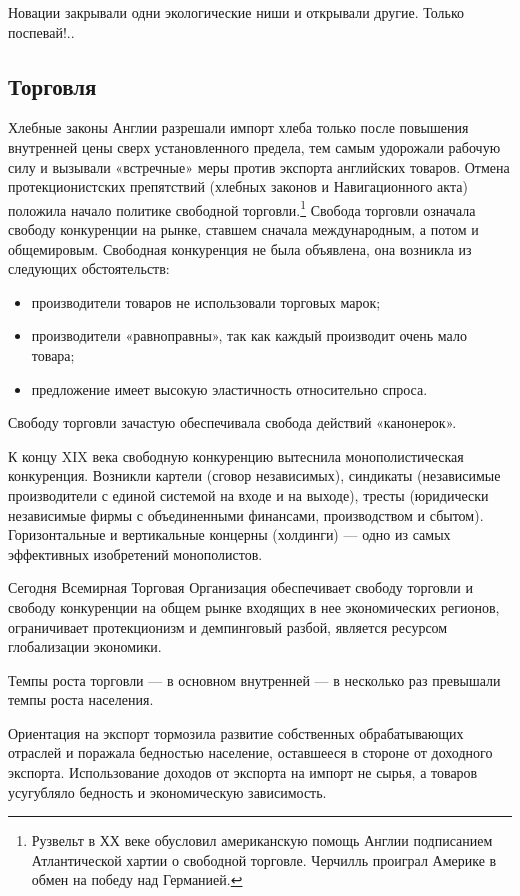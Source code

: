 Новации закрывали одни экологические ниши и открывали другие. Только поспевай!..

\subsection[Торговля]{Торговля}

Хлебные законы Англии разрешали импорт хлеба только после повышения внутренней цены сверх установленного предела, тем
самым удорожали рабочую силу и вызывали «встречные» меры против экспорта английских товаров. Отмена протекционистских
препятствий (хлебных законов и Навигационного акта) положила начало политике свободной
торговли.\footnote{Рузвельт в ХХ веке обусловил американскую помощь Англии подписанием Атлантической
хартии о свободной торговле. Черчилль проиграл Америке в обмен на победу над Германией.} Свобода торговли означала
свободу конкуренции на рынке, ставшем сначала международным, а потом и общемировым. Свободная конкуренция не была
объявлена, она возникла из следующих обстоятельств:

\begin{itemize}
\item производители товаров не использовали торговых марок;
\item производители «равноправны», так как каждый производит очень мало товара;
\item предложение имеет высокую эластичность относительно спроса.
\end{itemize}

Свободу торговли зачастую обеспечивала свобода действий «канонерок».

К концу XIX века свободную конкуренцию вытеснила монополистическая конкуренция. Возникли картели (сговор независимых),
синдикаты (независимые производители с единой системой на входе и на выходе), тресты (юридически независимые фирмы с
объединенными финансами, производством и сбытом). Горизонтальные и вертикальные концерны (холдинги) — одно из самых
эффективных изобретений монополистов.

Сегодня Всемирная Торговая Организация обеспечивает свободу торговли и свободу конкуренции на общем рынке входящих в нее
экономических регионов, ограничивает протекционизм и демпинговый разбой, является ресурсом глобализации экономики.


Темпы роста торговли — в основном внутренней — в несколько раз превышали темпы роста населения.


Ориентация на экспорт тормозила развитие собственных обрабатывающих отраслей и поражала бедностью население, оставшееся
в стороне от доходного экспорта. Использование доходов от экспорта на импорт не сырья, а товаров усугубляло бедность и
экономическую зависимость.


